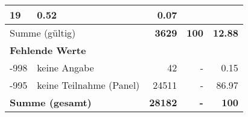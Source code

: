 \begin{longtable}{lXrrr}
       \num{19} &
       \num[round-mode=places,round-precision=2]{0.52} &
         \num[round-mode=places,round-precision=2]{0.07} \\
     \midrule
     \multicolumn{2}{l}{Summe (gültig)} &
       \textbf{\num{3629}} &
     \textbf{\num{100}} &
       \textbf{\num[round-mode=places,round-precision=2]{12.88}} \\
     \multicolumn{5}{l}{\textbf{Fehlende Werte}}\\
       -998 &
       keine Angabe &
         \num{42} &
        - &
         \num[round-mode=places,round-precision=2]{0.15} \\
       -995 &
       keine Teilnahme (Panel) &
         \num{24511} &
        - &
         \num[round-mode=places,round-precision=2]{86.97} \\
     \midrule
     \multicolumn{2}{l}{\textbf{Summe (gesamt)}} &
          \textbf{\num{28182}} &
        \textbf{-} &
        \textbf{\num{100}} \\
     \bottomrule
     \end{longtable}
     
